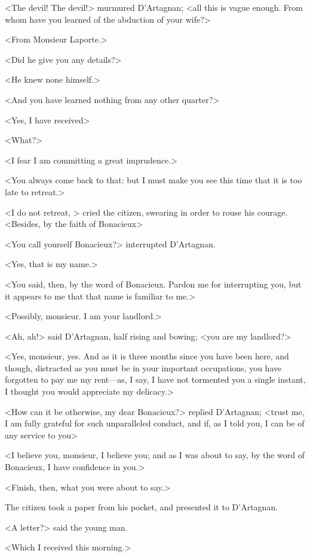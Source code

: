 <The devil! The devil!> murmured D'Artagnan; <all this is vague enough. From whom have you learned of the abduction of your wife?> 

<From Monsieur Laporte.> 

<Did he give you any details?> 

<He knew none himself.> 

<And you have learned nothing from any other quarter?> 

<Yes, I have received\longdash> 

<What?> 

<I fear I am committing a great imprudence.> 

<You always come back to that; but I must make you see this time that it is too late to retreat.> 

<I do not retreat, > cried the citizen, swearing in order to rouse his courage. <Besides, by the faith of Bonacieux\longdash> 

<You call yourself Bonacieux?> interrupted D'Artagnan. 

<Yes, that is my name.> 

<You said, then, by the word of Bonacieux. Pardon me for interrupting you, but it appears to me that that name is familiar to me.> 

<Possibly, monsieur. I am your landlord.> 

<Ah, ah!> said D'Artagnan, half rising and bowing; <you are my landlord?> 

<Yes, monsieur, yes. And as it is three months since you have been here, and though, distracted as you must be in your important occupations, you have forgotten to pay me my rent—as, I say, I have not tormented you a single instant, I thought you would appreciate my delicacy.> 

<How can it be otherwise, my dear Bonacieux?> replied D'Artagnan; <trust me, I am fully grateful for such unparalleled conduct, and if, as I told you, I can be of any service to you\longdash> 

<I believe you, monsieur, I believe you; and as I was about to say, by the word of Bonacieux, I have confidence in you.> 

<Finish, then, what you were about to say.> 

The citizen took a paper from his pocket, and presented it to D'Artagnan. 

<A letter?> said the young man. 

<Which I received this morning.> 

